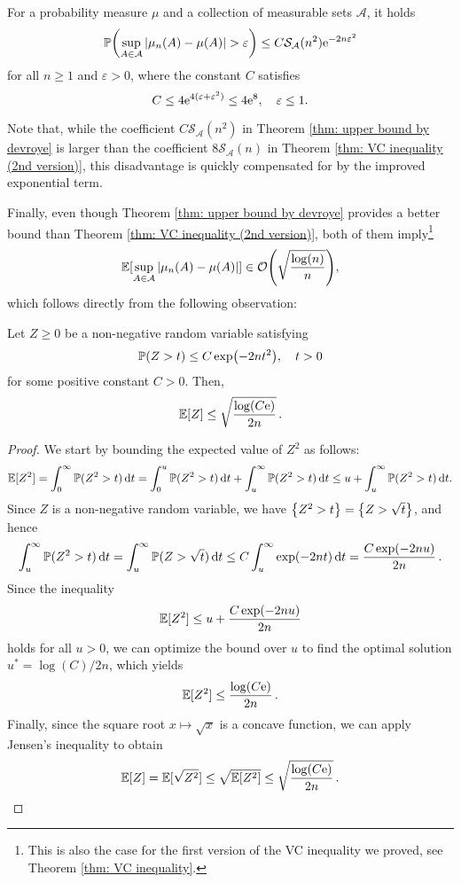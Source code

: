 \begin{theorem}[Devroye, 1982]
\label{thm: upper bound by devroye}
For a probability measure $\mu$ and a collection of measurable sets $\mathcal{A}$, it holds
\[
    \Prob\left(\sup_{A \in \mathcal{A}} \abs{\mu_n(A) - \mu(A)} > \varepsilon\right) \leq C \mathcal{S}_{\mathcal{A}}(n^2) \e^{-2n \varepsilon^2}
\]
for all $n \geq 1$ and $\varepsilon > 0$, where the constant $C$ satisfies
\[
    C \leq 4 \mathrm{e}^{4(\varepsilon + \varepsilon^2)} \leq 4 \mathrm{e}^8, \quad \varepsilon \leq 1.
\]
\end{theorem}

Note that, while the coefficient $C \mathcal{S}_{\mathcal{A}}(n^2)$ in Theorem \ref{thm: upper bound by devroye} is larger than the coefficient $8 \mathcal{S}_{\mathcal{A}}(n)$ in Theorem \ref{thm: VC inequality (2nd version)}, this disadvantage is quickly compensated for by the improved exponential term.

Finally, even though Theorem \ref{thm: upper bound by devroye} provides a better bound than Theorem \ref{thm: VC inequality (2nd version)}, both of them imply\footnote{This is also the case for the first version of the VC inequality we proved, see Theorem \ref{thm: VC inequality}.}
\begin{equation}
\label{eq: order of uniform deviations}
    \Exp[\sup_{A \in \mathcal{A}} \abs{\mu_n(A) - \mu(A)}] \in \mathcal{O}\left(\sqrt{\frac{\log(n)}{n}}\right),
\end{equation}
which follows directly from the following observation:

\begin{proposition}
Let $Z \geq 0$ be a non-negative random variable satisfying
\[
    \operatorname{\mathbb{P}}(Z > t) \leq C \exp(-2nt^2), \quad t > 0
\]
for some positive constant $C > 0$. Then,
\[
    \operatorname{\mathbb{E}}[Z] \leq \sqrt{\frac{\log(C\mathrm{e})}{2n}} \, .
\]
\end{proposition}

\begin{proof}
We start by bounding the expected value of $Z^2$ as follows:
\[
    \operatorname{\mathbb{E}}[Z^2] = \int_0^{\infty} \operatorname{\mathbb{P}}(Z^2 > t) \, \mathrm{d}t = \int_0^u \operatorname{\mathbb{P}}(Z^2 > t) \, \mathrm{d}t + \int_u^{\infty} \operatorname{\mathbb{P}}(Z^2 > t) \, \mathrm{d}t \leq u + \int_u^{\infty} \operatorname{\mathbb{P}}(Z^2 > t) \, \mathrm{d}t.
\]
Since $Z$ is a non-negative random variable, we have $\set{Z^2 > t} = \set{Z > \sqrt{t}}$, and hence
\[
    \int_u^{\infty} \operatorname{\mathbb{P}}(Z^2 > t) \, \mathrm{d}t = \int_u^{\infty} \operatorname{\mathbb{P}}(Z > \sqrt{t}) \, \mathrm{d}t \leq C \int_u^{\infty} \exp(-2nt) \, \mathrm{d}t = \frac{C \exp(-2nu)}{2n} \, .
\]
Since the inequality
\[
    \operatorname{\mathbb{E}}[Z^2] \leq u + \frac{C \exp(-2nu)}{2n}
\]
holds for all $u > 0$, we can optimize the bound over $u$ to find the optimal solution $u^* = \log(C) / 2n$, which yields
\[
    \operatorname{\mathbb{E}}[Z^2] \leq \frac{\log(C\mathrm{e})}{2n} \, .
\]
Finally, since the square root $x \mapsto \sqrt{x}$ is a concave function, we can apply Jensen's inequality to obtain
\[
    \operatorname{\mathbb{E}}[Z] = \operatorname{\mathbb{E}}[\sqrt{Z^2}] \leq \sqrt{\operatorname{\mathbb{E}}[Z^2]} \leq \sqrt{\frac{\log(C\mathrm{e})}{2n}} \, . \qedhere
\]
\end{proof}

